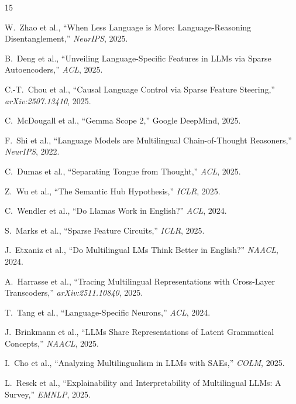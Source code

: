 \documentclass[10pt,twocolumn,a4paper]{article}
\begin{document}
\vspace{0.6em}
\begingroup
\footnotesize
\renewcommand{\section}[2]{}
\begin{thebibliography}{15}

W.~Zhao et al., ``When Less Language is More: Language-Reasoning Disentanglement,'' \textit{NeurIPS}, 2025.

B.~Deng et al., ``Unveiling Language-Specific Features in LLMs via Sparse Autoencoders,'' \textit{ACL}, 2025.

C.-T.~Chou et al., ``Causal Language Control via Sparse Feature Steering,'' \textit{arXiv:2507.13410}, 2025.

C.~McDougall et al., ``Gemma Scope 2,'' Google DeepMind, 2025.

F.~Shi et al., ``Language Models are Multilingual Chain-of-Thought Reasoners,'' \textit{NeurIPS}, 2022.

C.~Dumas et al., ``Separating Tongue from Thought,'' \textit{ACL}, 2025.

Z.~Wu et al., ``The Semantic Hub Hypothesis,'' \textit{ICLR}, 2025.

C.~Wendler et al., ``Do Llamas Work in English?'' \textit{ACL}, 2024.

S.~Marks et al., ``Sparse Feature Circuits,'' \textit{ICLR}, 2025.

J.~Etxaniz et al., ``Do Multilingual LMs Think Better in English?'' \textit{NAACL}, 2024.

A.~Harrasse et al., ``Tracing Multilingual Representations with Cross-Layer Transcoders,'' \textit{arXiv:2511.10840}, 2025.

T.~Tang et al., ``Language-Specific Neurons,'' \textit{ACL}, 2024.

J.~Brinkmann et al., ``LLMs Share Representations of Latent Grammatical Concepts,'' \textit{NAACL}, 2025.

I.~Cho et al., ``Analyzing Multilingualism in LLMs with SAEs,'' \textit{COLM}, 2025.

L.~Resck et al., ``Explainability and Interpretability of Multilingual LLMs: A Survey,'' \textit{EMNLP}, 2025.

\end{thebibliography}
\endgroup
\end{document}
